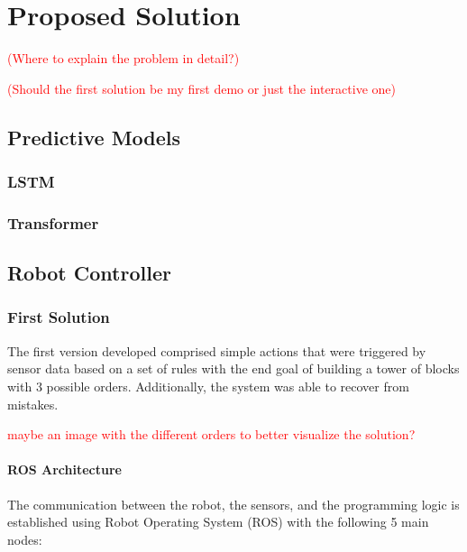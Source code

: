 \chapter{Proposed Solution}
\label{chapter:proposed_solution}

\textcolor{red}{(Where to explain the problem in detail?)}

\textcolor{red}{(Should the first solution be my first demo or just the interactive one)}

\section{Predictive Models}

\subsection{LSTM}

\subsection{Transformer}

\section{Robot Controller}

\subsection{First Solution}

The first version developed comprised simple actions that were triggered by sensor data based on a set of rules with the end goal of building a tower of blocks with 3 possible orders. Additionally, the system was able to recover from mistakes.

\textcolor{red}{maybe an image with the different orders to better visualize the solution?}

\subsubsection{ROS Architecture}

The communication between the robot, the sensors, and the programming logic is established using Robot Operating System (ROS) with the following 5 main nodes:

